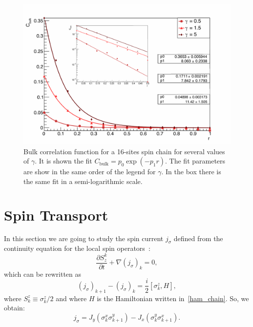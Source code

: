 \begin{figure}[H]
    \centering
    \includegraphics[scale=0.8]{Figures/16sites/FIT_16sites_CFBulkCONN.pdf}
    \captionsetup{width=1.\linewidth}
    \caption{Bulk correlation function for a 16-sites spin chain for several values of $\gamma$. It is shown the fit $C_{\text{bulk}} = p_0 \exp{(-p_1 r)}$. The fit parameters are show in the same order of the legend for $\gamma$. In the box there is the same fit in a semi-logarithmic scale.}
    \label{fig:16sites_FIT_CFBulkCONNvsGamma}
\end{figure}


\section{Spin Transport}
In this section we are going to study the spin current $j_\sigma$ defined from the continuity equation for the local spin operators~\cite{BenentiCasatiProsenRossini}:
\begin{equation}
    \frac{\partial S^k_z}{\partial t} + \nabla (j_\sigma)_k = 0,
\end{equation}
which can be rewritten as
\begin{equation}
    (j_\sigma)_{k+1}-(j_\sigma)_k = \frac{i}{2}[\sigma_k^z , H],
\end{equation}
where $S_k^z \equiv \sigma_k^z/2$ and where $H$ is the Hamiltonian written in~\ref{ham_chain}. So, we obtain:
\begin{equation}
    j_\sigma = J_y (\sigma_k^x \sigma_{k+1}^y) - J_x (\sigma_k^y \sigma_{k+1}^x). 
\end{equation}


